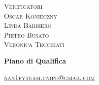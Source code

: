 \documentclass[8pt]{article}
\begin{document}
\begin{titlepage}
\begin{minipage}[t]{0.47\textwidth}
		{\large{\textsc{Verificatori}}
			\vspace{3mm}
			{\\\large{\textsc{Oscar Konieczny}\\}} 
			{\large{\textsc{Linda Barbiero}\\}} 
			{\large{\textsc{Pietro Busato}\\}}
			{\large{\textsc{Veronica Tecchiati}\\}}
		}
		\vspace{2mm}\vspace{2mm}
	\end{minipage}
	\vspace{4cm}
	\begin{center}
		\begin{flushright}
			{\fontsize{30pt}{52pt}\selectfont \textbf{Piano di Qualifica}} %
		\end{flushright}
		\vspace{3cm}
	\end{center}
	\vspace{9cm}
	{\small \textsc{\href{mailto: nan1fyteam.unipd@gmail.com}{nan1fyteam.unipd@gmail.com}}}
\end{titlepage}
\pagestyle{mystyle}
\end{document}
